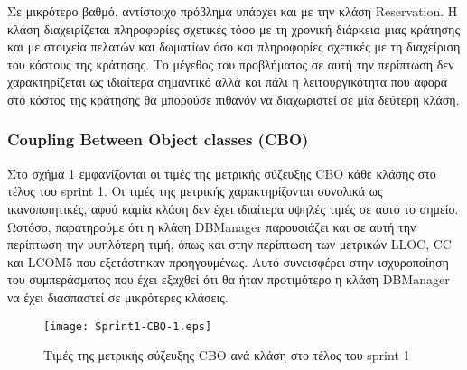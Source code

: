Σε μικρότερο βαθμό, αντίστοιχο πρόβλημα υπάρχει και με την κλάση
Reservation. Η κλάση διαχειρίζεται πληροφορίες σχετικές τόσο με τη
χρονική διάρκεια μιας κράτησης και με στοιχεία πελατών και δωματίων
όσο και πληροφορίες σχετικές με τη διαχείριση του κόστους της κράτησης.
Το μέγεθος του προβλήματος σε αυτή την περίπτωση δεν χαρακτηρίζεται ως
ιδιαίτερα σημαντικό αλλά και πάλι η λειτουργικότητα που αφορά στο κόστος
της κράτησης θα μπορούσε πιθανόν να διαχωριστεί σε μία δεύτερη κλάση.

\subsubsection{Coupling Between Object classes (CBO)}
\label{section:sprint1CBO}

Στο σχήμα \ref{fig:sprint1CBO} εμφανίζονται οι τιμές της μετρικής
σύζευξης CBO κάθε κλάσης στο τέλος του sprint 1. Οι τιμές της μετρικής
χαρακτηρίζονται συνολικά ως ικανοποιητικές, αφού καμία κλάση δεν έχει
ιδιαίτερα υψηλές τιμές σε αυτό το σημείο. Ωστόσο, παρατηρούμε ότι η
κλάση DBManager παρουσιάζει και σε αυτή την περίπτωση την υψηλότερη
τιμή, όπως και στην περίπτωση των μετρικών LLOC, CC και LCOM5 που
εξετάστηκαν προηγουμένως. Αυτό συνεισφέρει στην ισχυροποίηση του
συμπεράσματος που έχει εξαχθεί ότι θα ήταν προτιμότερο η κλάση DBManager
να έχει διασπαστεί σε μικρότερες κλάσεις.

\begin{figure}
\centering
\texttt{[image: Sprint1-CBO-1.eps]}
\caption{Τιμές της μετρικής σύζευξης CBO ανά κλάση στο τέλος του sprint 1}
\label{fig:sprint1CBO}
\end{figure}
